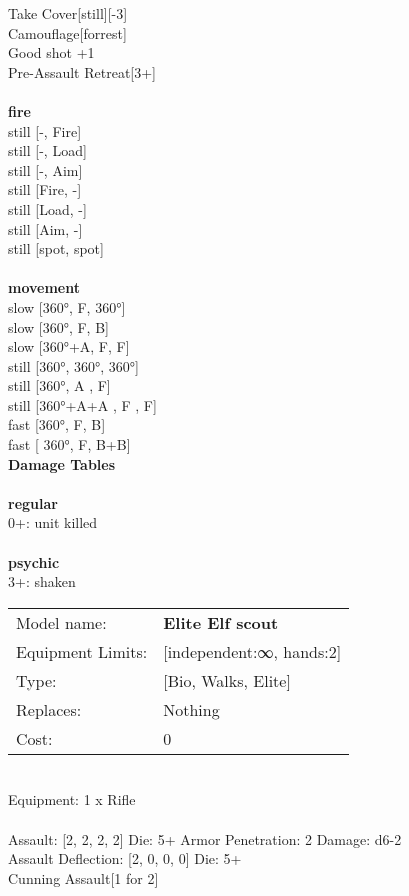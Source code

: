 \noindent Take Cover[still][-3]\\ 
Camouflage[forrest]\\ 
Good shot +1\\ 
Pre-Assault Retreat[3+]\\ 


\ \\ {\bf fire } \\
still [-, Fire] \\
still [-, Load] \\
still [-, Aim] \\
still [Fire, -] \\
still [Load, -] \\
still [Aim, -] \\
still [spot, spot] \\
\ \\ {\bf movement } \\
slow [360°, F, 360°] \\
slow [360°, F, B] \\
slow [360°+A, F, F] \\
still [360°, 360°, 360°] \\
still [360°, A , F] \\
still [360°+A+A , F , F] \\
fast [360°, F, B] \\
fast [ 360°,  F, B+B] \\


{\bf Damage Tables} \\
\ \\ {\bf regular } \\
0+: unit killed \\
\ \\ {\bf psychic } \\
3+: shaken \\


\noindent
\begin{tabular}{ll}
Model name: &{\bf Elite Elf scout } \\
Equipment Limits: &[independent:∞, hands:2] \\
Type: &[Bio, Walks, Elite] \\
Replaces: &Nothing \\
Cost: & 0\\
\end{tabular}
\ \\
Equipment: 1 x Rifle \\
\ \\
Assault: [2, 2, 2, 2] Die: 5+ Armor Penetration: 2 Damage: d6-2 \\
Assault Deflection: [2, 0, 0, 0] Die: 5+\\
\indent Cunning Assault[1 for 2]\\ 
 
